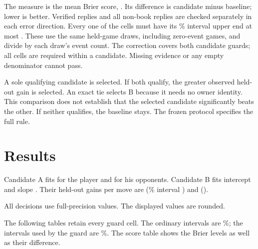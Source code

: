 \documentclass{article}
\begin{document}
The measure is the mean Brier score, \BrierFormula. Its difference is
candidate minus baseline; lower is better. Verified replies and all
non-book replies are checked separately in each error direction. Every
one of the \GuardCells{} cells must have its \AdjustedCI\% interval upper
end at most \GuardMargin. These use the same held-game draws, including
zero-event games, and divide by each draw's event count. The correction
covers both candidate guards; all cells are required within a candidate.
Missing evidence or any empty denominator cannot pass.

A sole qualifying candidate is selected. If both qualify, the greater
observed held-out gain is selected.
An exact tie selects B because it needs no owner identity. This comparison
does not establish that the selected candidate significantly beats the
other. If neither qualifies, the baseline stays. The frozen protocol specifies the full rule.

\section{Results}
Candidate A fits \PlayerOffset{} for the player and \OpponentOffset{} for
his opponents. Candidate B fits intercept \Intercept{} and slope \Slope.
Their held-out gains per move are \GainA{} (\OrdinaryCI\% interval
\IntervalA) and \GainB{} (\IntervalB).

\begin{center}\small\FitTable\end{center}
\begin{center}\small\GainTable\end{center}
\begin{center}\small\HolmTable\end{center}

\OutcomeDetail{} \SelectionDetail{}
\Verdict{}

All decisions use full-precision values. The displayed values are rounded.

The following tables retain every guard cell. The ordinary intervals are
\OrdinaryCI\%; the intervals used by the guard are \AdjustedCI\%. The
score table shows the Brier levels as well as their difference.

\begin{center}\small\GuardScoreTable\end{center}
\begin{center}\small\GuardIntervalTable\end{center}
\GuardFinding{}
\end{document}
